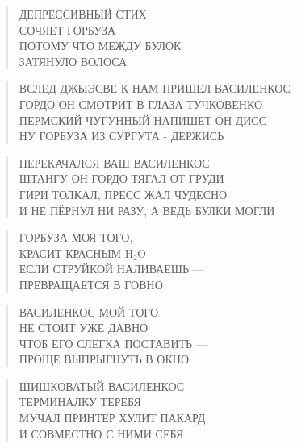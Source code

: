 \poemtitle{***}
\begin{verse}
ДЕПРЕССИВНЫЙ СТИХ\\
СОЧЯЕТ ГОРБУЗА\\
ПОТОМУ ЧТО МЕЖДУ БУЛОК\\
ЗАТЯНУЛО ВОЛОСА
\end{verse}

\poemtitle{***}
\begin{verse}
ВСЛЕД ДЖЫЭСВЕ К НАМ ПРИШЕЛ ВАСИЛЕНКОС\\
ГОРДО ОН СМОТРИТ В ГЛАЗА ТУЧКОВЕНКО\\
ПЕРМСКИЙ ЧУГУННЫЙ НАПИШЕТ ОН ДИСС\\
НУ ГОРБУЗА ИЗ СУРГУТА - ДЕРЖИСЬ
\end{verse}

\poemtitle{***}
\begin{verse}
ПЕРЕКАЧАЛСЯ ВАШ ВАСИЛЕНКОС\\
ШТАНГУ ОН ГОРДО ТЯГАЛ ОТ ГРУДИ\\
ГИРИ ТОЛКАЛ, ПРЕСС ЖАЛ ЧУДЕСНО\\
И НЕ ПЁРНУЛ НИ РАЗУ, А ВЕДЬ БУЛКИ МОГЛИ
\end{verse}

\poemtitle{***}
\begin{verse}
ГОРБУЗА МОЯ ТОГО, \\
КРАСИТ КРАСНЫМ H₂O\\
ЕСЛИ СТРУЙКОЙ НАЛИВАЕШЬ — \\
ПРЕВРАЩАЕТСЯ В ГОВНО
\end{verse}

\poemtitle{***}
\begin{verse}
ВАСИЛЕНКОС МОЙ ТОГО\\
НЕ СТОИТ УЖЕ ДАВНО\\
ЧТОБ ЕГО СЛЕГКА ПОСТАВИТЬ —\\
ПРОЩЕ ВЫПРЫГНУТЬ В ОКНО
\end{verse}

\poemtitle{***}
\begin{verse}
ШИШКОВАТЫЙ ВАСИЛЕНКОС\\
ТЕРМИНАЛКУ ТЕРЕБЯ\\
МУЧАЛ ПРИНТЕР ХУЛИТ ПАКАРД\\
И СОВМЕСТНО С НИМИ СЕБЯ
\end{verse}


